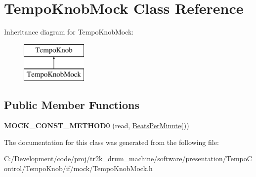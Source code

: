 \hypertarget{class_tempo_knob_mock}{}\section{Tempo\+Knob\+Mock Class Reference}
\label{class_tempo_knob_mock}
Inheritance diagram for Tempo\+Knob\+Mock\+:\begin{figure}[H]
\begin{center}
\leavevmode
\includegraphics[height=2.000000cm]{class_tempo_knob_mock}
\end{center}
\end{figure}
\subsection*{Public Member Functions}
\begin{DoxyCompactItemize}
\item 
\mbox{\label{class_tempo_knob_mock_a2d3e4d224e3972cca38277f9ed25517d}} 
{\bfseries M\+O\+C\+K\+\_\+\+C\+O\+N\+S\+T\+\_\+\+M\+E\+T\+H\+O\+D0} (read, \mbox{\hyperlink{class_beats_per_minute}{Beats\+Per\+Minute}}())
\end{DoxyCompactItemize}


The documentation for this class was generated from the following file\+:\begin{DoxyCompactItemize}
\item 
C\+:/\+Development/code/proj/tr2k\+\_\+drum\+\_\+machine/software/presentation/\+Tempo\+Control/\+Tempo\+Knob/if/mock/Tempo\+Knob\+Mock.\+h\end{DoxyCompactItemize}
